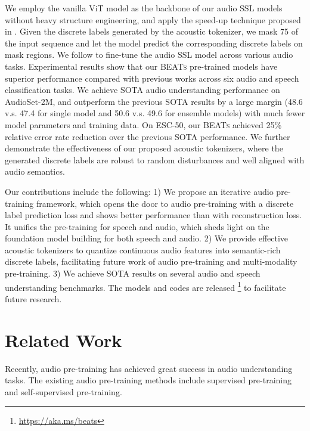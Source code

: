 \documentclass{article}
\theoremstyle{plain}
\theoremstyle{definition}
\theoremstyle{remark}
\newcommand\our{\textsc{BEATs}}
\begin{document}
We employ the vanilla ViT model \citep{vit} as the backbone of our audio SSL models without heavy structure engineering, and apply the speed-up technique proposed in \citet{he2022masked}. Given the discrete labels generated by the acoustic tokenizer, we mask 75 of the input sequence and let the model predict the corresponding discrete labels on mask regions. We follow \citet{xu2022masked} to fine-tune the audio SSL model across various audio tasks. 
Experimental results show that our \our{}  pre-trained models have superior performance compared with previous works across six audio and speech classification tasks.
We achieve SOTA audio understanding performance on AudioSet-2M, and outperform the previous SOTA results by a large margin (48.6 v.s. 47.4 for single model and 50.6 v.s. 49.6 for ensemble models) with much fewer model parameters and training data. 
On ESC-50, our \our{} achieved 25\% relative  error rate reduction over the previous SOTA performance.
We further demonstrate the effectiveness of our proposed acoustic tokenizers, where the generated discrete labels are robust to random disturbances and well aligned with audio semantics.

Our contributions include the following:
1) We propose an iterative audio pre-training framework, which opens the door to audio pre-training with a discrete label prediction loss and shows better performance than with reconstruction loss. It unifies the pre-training for speech and audio, which sheds light on the foundation model building for both speech and audio. 
2)  We provide effective acoustic tokenizers to quantize continuous audio features into semantic-rich discrete labels, facilitating future work of audio pre-training and multi-modality pre-training.  
3) We achieve SOTA results on several audio and speech understanding benchmarks. The models and codes are released \footnote{\url{https://aka.ms/beats}}
to facilitate future research.

\section{Related Work}

Recently, audio pre-training has achieved great success in audio understanding tasks.
The existing audio pre-training methods include supervised pre-training and self-supervised pre-training.
\end{document}
